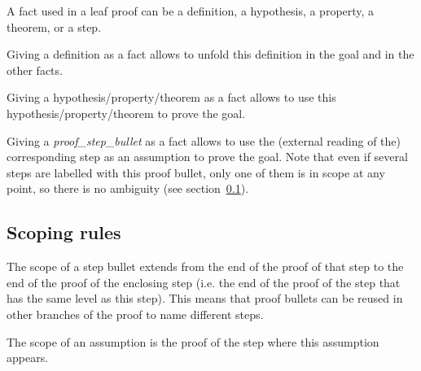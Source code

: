 
A fact used in a leaf proof can be a definition, a hypothesis, a
property, a theorem, or a step.

Giving a definition as a fact allows \zenon{} to unfold this
definition in the goal and in the other facts.

Giving a hypothesis/property/theorem as a fact allows \zenon{} to use
this hypothesis/property/theorem to prove the goal.

Giving a {\em proof\_step\_bullet} as a fact allows \zenon{} to use the
(external reading of the) corresponding step as an assumption to prove
the goal.  Note that even if several steps are labelled with this
proof bullet, only one of them is in scope at any point, so there is
no ambiguity (see section~\ref{sec:scoping}).

\subsection{Scoping rules}\label{sec:scoping}

The scope of a step bullet extends from the end of the proof of that
step to the end of the proof of the enclosing step (i.e. the end of
the proof of the  step that has the same level as this
step).  This means that proof bullets can be reused in other branches
of the proof to name different steps.

The scope of an assumption is the proof of the step where this
assumption appears.
